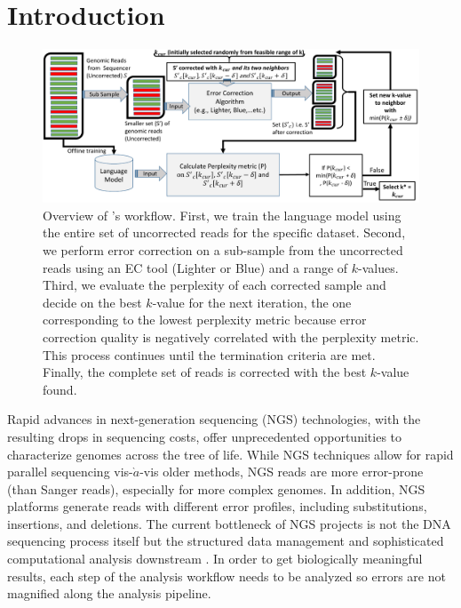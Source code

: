 \section{Introduction}
\begin{figure}
\centering
\includegraphics[width=\linewidth]{figs/AthenaOverview_Compressed2_cropped.pdf}
\caption{Overview of \name's workflow. First, we train the language model using the entire set of uncorrected reads for the specific dataset. Second, we perform error correction on a sub-sample from the uncorrected reads using an EC tool (\eg Lighter or Blue) and a range of $k$-values. Third, we evaluate the perplexity of each corrected sample and decide on the best $k$-value for the next iteration, \ie the one corresponding to the lowest perplexity metric because error correction quality is negatively correlated with the perplexity metric. This process continues until the termination criteria are met. Finally, the complete set of reads is corrected with the best $k$-value found.}	
\label{fig:AthenaOverview}
\end{figure}
\vspace{-10pt}
Rapid advances in next-generation sequencing (NGS) technologies, with the resulting drops in sequencing costs, offer unprecedented opportunities to characterize genomes across the tree of life. %
While NGS techniques allow for rapid parallel sequencing vis-$\grave{a}$-vis older methods, NGS reads are more error-prone (than Sanger reads), especially for more complex genomes. %
In addition, NGS platforms generate reads with different error profiles, including substitutions, insertions, and deletions. The current bottleneck of NGS projects is not the DNA sequencing process itself but the structured data management and sophisticated computational analysis downstream \cite{schadt2010computational}. In order to get biologically meaningful results, each step of the analysis workflow needs to be analyzed so errors are not magnified along the analysis pipeline.
